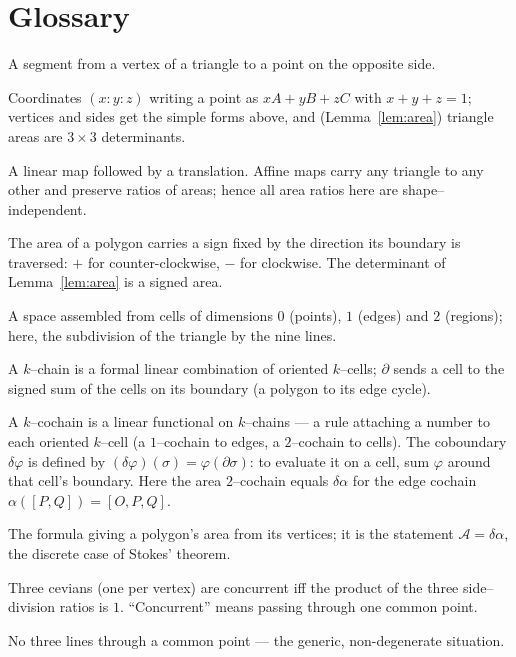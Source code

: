 \documentclass[11pt,a4paper,reqno]{amsart}
\theoremstyle{definition}
\theoremstyle{remark}
\begin{document}
\section*{Glossary}
\begin{description}[leftmargin=0em,labelsep=0.5em,itemsep=2pt]
\item[Cevian] A segment from a vertex of a triangle to a point on the opposite side.
\item[Barycentric coordinates] Coordinates $(x:y:z)$ writing a point as $xA+yB+zC$ with $x+y+z=1$; vertices and
sides get the simple forms above, and (Lemma~\ref{lem:area}) triangle areas are $3\times3$ determinants.
\item[Affine map / affine invariance] A linear map followed by a translation. Affine maps carry any triangle to
any other and preserve ratios of areas; hence all area ratios here are shape--independent.
\item[Signed area / orientation (Umlaufrichtung)] The area of a polygon carries a sign fixed by the direction its
boundary is traversed: $+$ for counter-clockwise, $-$ for clockwise. The determinant of Lemma~\ref{lem:area} is a
signed area.
\item[CW--complex] A space assembled from cells of dimensions $0$ (points), $1$ (edges) and $2$ (regions); here,
the subdivision of the triangle by the nine lines.
\item[Chain; boundary operator $\partial$] A $k$--chain is a formal linear combination of oriented $k$--cells;
$\partial$ sends a cell to the signed sum of the cells on its boundary (a polygon to its edge cycle).
\item[Cochain; coboundary $\delta$] A $k$--cochain is a linear functional on $k$--chains --- a rule attaching a
number to each oriented $k$--cell (a $1$--cochain to edges, a $2$--cochain to cells). The coboundary
$\delta\varphi$ is defined by $(\delta\varphi)(\sigma)=\varphi(\partial\sigma)$: to evaluate it on a cell, sum
$\varphi$ around that cell's boundary. Here the area $2$--cochain equals $\delta\alpha$ for the edge cochain
$\alpha([P,Q])=[O,P,Q]$.
\item[Shoelace formula / discrete Stokes] The formula giving a polygon's area from its vertices; it is the
statement $\mathcal A=\delta\alpha$, the discrete case of Stokes' theorem.
\item[Ceva's theorem] Three cevians (one per vertex) are concurrent iff the product of the three side--division
ratios is $1$. ``Concurrent'' means passing through one common point.
\item[General position] No three lines through a common point --- the generic, non-degenerate situation.

\end{description}
\end{document}
